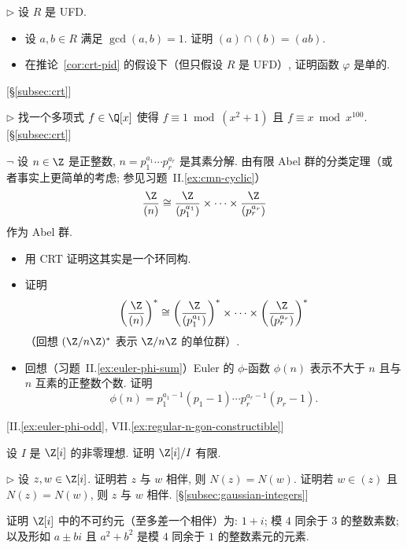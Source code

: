 \begin{prob}
\label{ex:ufd-crt-intersection}
$\triangleright$ 设 $R$ 是 UFD.
\begin{itemize}
\item 设 $a,b\in R$ 满足 $\gcd(a,b)=1$. 证明 $(a)\cap(b)=(ab)$.
\item 在推论~\ref{cor:crt-pid} 的假设下（但只假设 $R$ 是 UFD）, 证明函数 $\varphi$ 是单的.
\end{itemize}
[§\ref{subsec:crt}]
\end{prob}

\begin{prob}
\label{ex:crt-poly-qx}
$\triangleright$ 找一个多项式 $f\in\Q[x]$ 使得 $f\equiv 1\bmod (x^2+1)$ 且 $f\equiv x\bmod x^{100}$. [§\ref{subsec:crt}]
\end{prob}

\begin{prob}
\label{ex:zn-crt-phi}
$\neg$ 设 $n\in\Z$ 是正整数, $n=p_1^{a_1}\cdots p_r^{a_r}$ 是其素分解. 由有限 Abel 群的分类定理（或者事实上更简单的考虑; 参见习题~II.\ref{ex:cmn-cyclic}）
\[
\frac{\Z}{(n)}\cong\frac{\Z}{(p_1^{a_1})}\times\cdots\times\frac{\Z}{(p_r^{a_r})}
\]
作为 Abel 群.
\begin{itemize}
\item 用 CRT 证明这其实是一个环同构.
\item 证明
\[
\left(\frac{\Z}{(n)}\right)^*\cong\left(\frac{\Z}{(p_1^{a_1})}\right)^*\times\cdots\times\left(\frac{\Z}{(p_r^{a_r})}\right)^*
\]
（回想 $(\Z/n\Z)^*$ 表示 $\Z/n\Z$ 的单位群）.
\item 回想（习题~II.\ref{ex:euler-phi-sum}）Euler 的 $\phi$-函数 $\phi(n)$ 表示不大于 $n$ 且与 $n$ 互素的正整数个数. 证明
\[
\phi(n)=p_1^{a_1-1}(p_1-1)\cdots p_r^{a_r-1}(p_r-1).
\]
\end{itemize}
[II.\ref{ex:euler-phi-odd}, VII.\ref{ex:regular-n-gon-constructible}]
\end{prob}

\begin{prob}
\label{ex:gauss-ideal-finite}
设 $I$ 是 $\Z[i]$ 的非零理想. 证明 $\Z[i]/I$ 有限.
\end{prob}

\begin{prob}
\label{ex:gauss-associate-norm}
$\triangleright$ 设 $z,w\in\Z[i]$. 证明若 $z$ 与 $w$ 相伴, 则 $N(z)=N(w)$. 证明若 $w\in(z)$ 且 $N(z)=N(w)$, 则 $z$ 与 $w$ 相伴. [§\ref{subsec:gaussian-integers}]
\end{prob}

\begin{prob}
\label{ex:gauss-irreducibles}
证明 $\Z[i]$ 中的不可约元（至多差一个相伴）为: $1+i$; 模 $4$ 同余于 $3$ 的整数素数; 以及形如 $a\pm bi$ 且 $a^2+b^2$ 是模 $4$ 同余于 $1$ 的整数素元的元素.
\end{prob}

